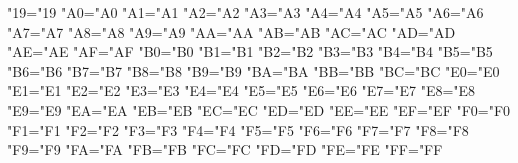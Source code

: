 \lccode"19="19 %
\lccode"A0="A0 %
\lccode"A1="A1 %
\lccode"A2="A2 %
\lccode"A3="A3 %
\lccode"A4="A4 %
\lccode"A5="A5 %
\lccode"A6="A6 %
\lccode"A7="A7 %
\lccode"A8="A8 %
\lccode"A9="A9 %
\lccode"AA="AA %
\lccode"AB="AB %
\lccode"AC="AC %
\lccode"AD="AD %
\lccode"AE="AE %
\lccode"AF="AF %
\lccode"B0="B0 %
\lccode"B1="B1 %
\lccode"B2="B2 %
\lccode"B3="B3 %
\lccode"B4="B4 %
\lccode"B5="B5 %
\lccode"B6="B6 %
\lccode"B7="B7 %
\lccode"B8="B8 %
\lccode"B9="B9 %
\lccode"BA="BA %
\lccode"BB="BB %
\lccode"BC="BC %
\lccode"E0="E0 %
\lccode"E1="E1 %
\lccode"E2="E2 %
\lccode"E3="E3 %
\lccode"E4="E4 %
\lccode"E5="E5 %
\lccode"E6="E6 %
\lccode"E7="E7 %
\lccode"E8="E8 %
\lccode"E9="E9 %
\lccode"EA="EA %
\lccode"EB="EB %
\lccode"EC="EC %
\lccode"ED="ED %
\lccode"EE="EE %
\lccode"EF="EF %
\lccode"F0="F0 %
\lccode"F1="F1 %
\lccode"F2="F2 %
\lccode"F3="F3 %
\lccode"F4="F4 %
\lccode"F5="F5 %
\lccode"F6="F6 %
\lccode"F7="F7 %
\lccode"F8="F8 %
\lccode"F9="F9 %
\lccode"FA="FA %
\lccode"FB="FB %
\lccode"FC="FC %
\lccode"FD="FD %
\lccode"FE="FE %
\lccode"FF="FF %


